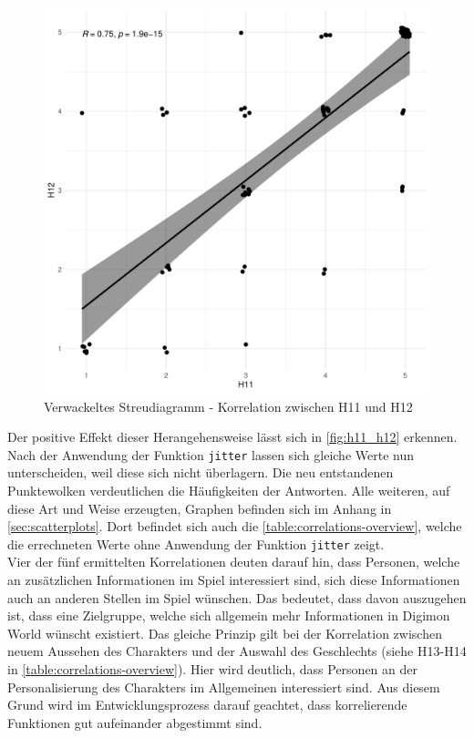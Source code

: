 \begin{figure}[H]
  \centering
  \includegraphics[width=0.65\columnwidth]{figures/plots/h11_h12.pdf}
  \caption{\label{fig:h11_h12} Verwackeltes Streudiagramm - Korrelation zwischen H11 und H12}
\end{figure}

Der positive Effekt dieser Herangehensweise lässt sich in \autoref{fig:h11_h12} erkennen.
Nach der Anwendung der Funktion \texttt{jitter} lassen sich gleiche Werte nun unterscheiden, weil diese sich nicht überlagern.
Die neu entstandenen Punktewolken verdeutlichen die Häufigkeiten der Antworten.
Alle weiteren, auf diese Art und Weise erzeugten, Graphen befinden sich im Anhang in \autoref{sec:scatterplots}.
Dort befindet sich auch die \autoref{table:correlations-overview}, welche die errechneten Werte ohne Anwendung der Funktion \texttt{jitter} zeigt.\\

Vier der fünf ermittelten Korrelationen deuten darauf hin, dass Personen, welche an zusätzlichen Informationen im Spiel interessiert sind, sich diese Informationen auch an anderen Stellen im Spiel wünschen.
Das bedeutet, dass davon auszugehen ist, dass eine Zielgruppe, welche sich allgemein mehr Informationen in Digimon World wünscht existiert.
Das gleiche Prinzip gilt bei der Korrelation zwischen neuem Aussehen des Charakters und der Auswahl des Geschlechts (siehe H13-H14 in \autoref{table:correlations-overview}).
Hier wird deutlich, dass Personen an der Personalisierung des Charakters im Allgemeinen interessiert sind.
Aus diesem Grund wird im Entwicklungsprozess darauf geachtet, dass korrelierende Funktionen gut aufeinander abgestimmt sind.\\

